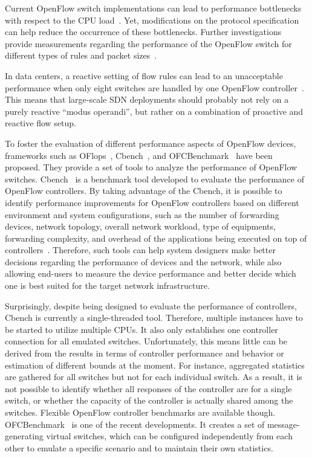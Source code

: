 Current OpenFlow switch implementations can lead to performance bottlenecks with respect to the CPU 
load~\cite{curtis2011}. Yet, modifications on the protocol specification can help reduce the occurrence 
of these bottlenecks. Further investigations provide measurements regarding the performance of the OpenFlow 
switch for different types of rules and packet sizes~\cite{bianco2010}.

In data centers, a reactive setting of flow rules can lead to an unacceptable performance when only eight 
switches are handled by one OpenFlow controller~\cite{pries2012}. This means that large-scale SDN deployments 
should probably not rely on a purely reactive ``modus operandi'', but rather on a combination of proactive and reactive 
flow setup.

To foster the evaluation of different performance aspects of OpenFlow devices, frameworks such as 
OFlops~\cite{rotsos2012-1},  Cbench~\cite{tootoonchian2012}, and OFCBenchmark~\cite{jarschel2012} 
have been proposed. They provide a set of tools to analyze the performance of OpenFlow switches.
Cbench~\cite{tootoonchian2012,sherwood2011} is a benchmark tool developed to evaluate the 
performance of OpenFlow controllers. By taking advantage of the Cbench, it is possible to identify performance 
improvements for OpenFlow controllers based on different environment and system configurations, such as the number 
of forwarding devices, network topology, overall network workload, type of equipments, forwarding complexity, and 
overhead of the applications being executed on top of controllers~\cite{tootoonchian2012}.
Therefore, such tools can help system designers make better decisions regarding the performance of devices and 
the network, while also allowing end-users to measure the device performance and better decide which one is best 
suited for the target network infrastructure.

Surprisingly, despite being designed to evaluate the performance of
controllers, Cbench is currently a single-threaded 
tool. Therefore, multiple instances have to be started to utilize multiple CPUs. It also only establishes one 
controller connection for all emulated switches. Unfortunately, this means little can be derived from the results in terms 
of controller performance and behavior or estimation of different bounds at the moment. For instance, aggregated
statistics are gathered for all switches but not for each individual switch. As a result, it is not possible to 
identify whether all responses of the controller are for a single switch, or whether the capacity of the controller 
is actually shared among the switches. Flexible OpenFlow controller benchmarks are available though. 
OFCBenchmark~\cite{jarschel2012} is one of the recent developments. It creates a set of message-generating virtual 
switches, which can be configured independently from each other to emulate a specific scenario and to maintain their 
own statistics.

